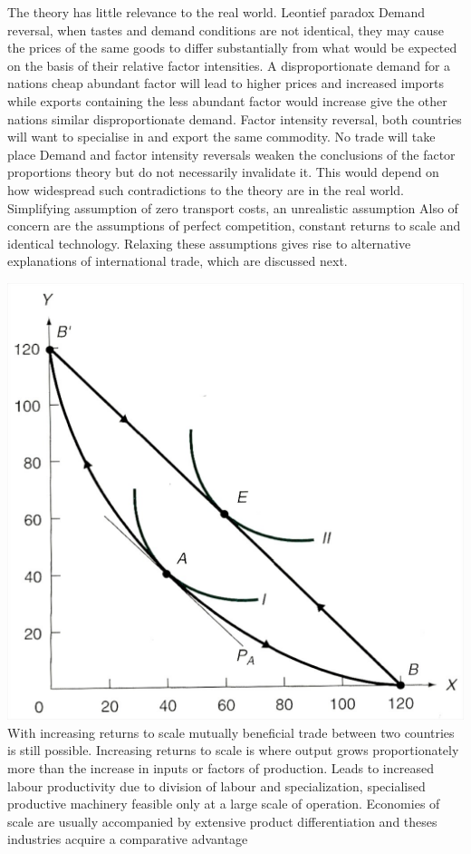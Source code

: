 \documentclass[12pt]{examnotes}
\begin{document}
\ra The theory has little relevance to the real world. 
\ra Leontief paradox 
\ra Demand reversal, when tastes and demand conditions are not identical, they may cause the prices of the same goods to differ substantially from what would be expected on the basis of their relative factor intensities. A disproportionate demand for a nations cheap abundant factor will lead to higher prices and increased imports while exports containing the less abundant factor would increase give the other nations similar disproportionate demand.
\ra Factor intensity reversal, both countries will want to specialise in and export the same commodity. No trade will take place
\ra Demand and factor intensity reversals weaken the conclusions of the factor proportions theory but do not necessarily invalidate it. This would depend on how widespread such contradictions to the theory are in the real world. 
\ra Simplifying assumption of zero transport costs, an unrealistic assumption
\ra Also of concern are the assumptions of perfect competition, constant returns to scale and identical technology. Relaxing these assumptions gives rise to alternative explanations of international trade, which are discussed next.

\includegraphics[scale=0.2]{./imgs/61.jpg}
\ra With increasing returns to scale mutually beneficial trade between two countries is still possible. \ra Increasing returns to scale is where output grows proportionately more than the increase in inputs or factors of production. Leads to increased labour productivity due to division of labour and specialization, specialised productive machinery feasible only at a large scale of operation. 
\ra Economies of scale are usually accompanied by extensive product differentiation and theses industries acquire a comparative advantage
\end{document}
